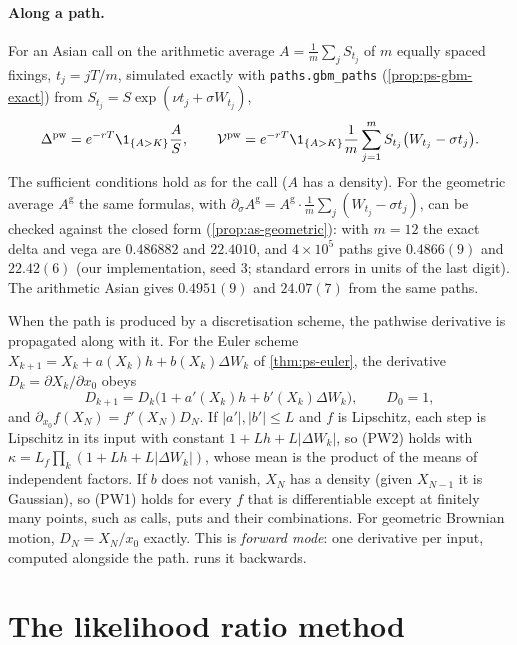 \paragraph{Along a path.} For an Asian call on the arithmetic average
$A=\frac1m\sum_jS_{t_j}$ of $m$ equally spaced fixings, $t_j=jT/m$, simulated exactly with
\texttt{paths.gbm\_paths} (\cref{prop:ps-gbm-exact}) from $S_{t_j}=S\exp(\nu t_j+\sigma W_{t_j})$,
\begin{equation}\label{eq:gr-asian-pw}
  \Delta^{\mathrm{pw}}=e^{-rT}\1_{\{A>K\}}\frac AS,\qquad
  \mathcal V^{\mathrm{pw}}=e^{-rT}\1_{\{A>K\}}\frac1m\sum_{j=1}^mS_{t_j}\big(W_{t_j}-\sigma t_j\big).
\end{equation}
The sufficient conditions hold as for the call ($A$ has a density). For the geometric average
$A^{\mathrm g}$ the same formulas, with $\partial_\sigma A^{\mathrm g}=A^{\mathrm g}\cdot\frac1m\sum_j(W_{t_j}-\sigma t_j)$, can be checked
against the closed form (\cref{prop:as-geometric}): with $m=12$ the exact delta and vega are
$0.486882$ and $22.4010$, and $4\times10^5$ paths give $0.4866(9)$ and $22.42(6)$ (our
implementation, seed $3$; standard errors in units of the last digit). The arithmetic Asian
gives $0.4951(9)$ and $24.07(7)$ from the same paths.

When the path is produced by a discretisation scheme, the pathwise derivative is propagated
along with it. For the Euler scheme $X_{k+1}=X_k+a(X_k)h+b(X_k)\Delta W_k$ of
\cref{thm:ps-euler}, the derivative $D_k=\partial X_k/\partial x_0$ obeys
\begin{equation}\label{eq:gr-tangent}
  D_{k+1}=D_k\big(1+a'(X_k)h+b'(X_k)\Delta W_k\big),\qquad D_0=1,
\end{equation}
and $\partial_{x_0}f(X_N)=f'(X_N)D_N$. If $|a'|,|b'|\le L$ and $f$ is Lipschitz, each step is
Lipschitz in its input with constant $1+Lh+L|\Delta W_k|$, so (PW2) holds with
$\kappa=L_f\prod_k(1+Lh+L|\Delta W_k|)$, whose mean is the product of the means of independent
factors. If $b$ does not vanish, $X_N$ has a density (given $X_{N-1}$ it is Gaussian), so (PW1)
holds for every $f$ that is differentiable except at finitely many points, such as calls, puts
and their combinations. For geometric Brownian motion,
$D_N=X_N/x_0$ exactly. This is \emph{forward mode}: one derivative per input, computed
alongside the path.  runs it backwards.

\section{The likelihood ratio method}\label{sec:gr-lr}

